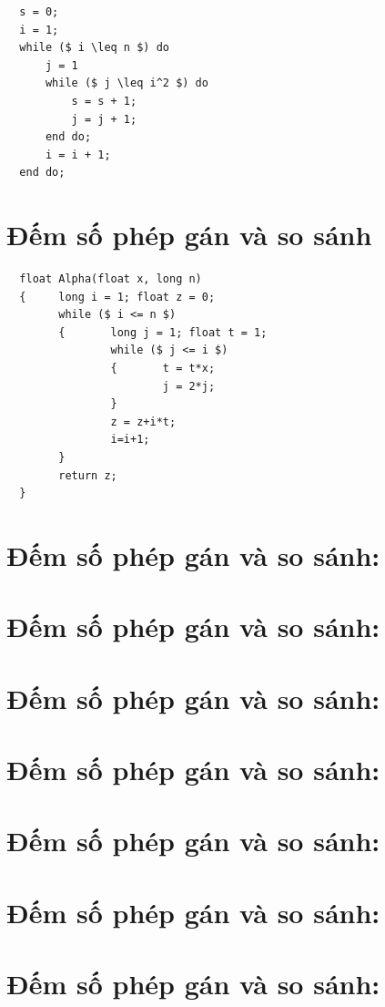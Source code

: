 \documentclass[12pt, letterpaper]{article}
\begin{document}
\begin{lstlisting}
  s = 0;
  i = 1;
  while ($ i \leq n $) do
      j = 1
      while ($ j \leq i^2 $) do
          s = s + 1;
          j = j + 1;
      end do;
      i = i + 1;
  end do;
  \end{lstlisting}

\section{Đếm số phép gán và so sánh}

\begin{lstlisting}
  float Alpha(float x, long n)
  {     long i = 1; float z = 0;
        while ($ i <= n $)
        {       long j = 1; float t = 1;
                while ($ j <= i $)
                {       t = t*x;
                        j = 2*j;
                }
                z = z+i*t;
                i=i+1;
        }
        return z;
  }
\end{lstlisting}

\section{Đếm số phép gán và so sánh:}
\section{Đếm số phép gán và so sánh:}
\section{Đếm số phép gán và so sánh:}
\section{Đếm số phép gán và so sánh:}
\section{Đếm số phép gán và so sánh:}
\section{Đếm số phép gán và so sánh:}
\section{Đếm số phép gán và so sánh:}
\end{document}
